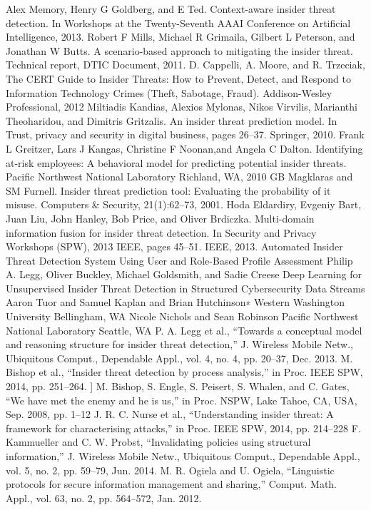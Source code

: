 \documentclass[conference]{IEEEtran}
\begin{document}
\begin{thebibliography}{00}
 Alex Memory, Henry G Goldberg, and E Ted. Context-aware insider threat detection. In Workshops at the Twenty-Seventh AAAI Conference on Artificial
Intelligence, 2013.
 Robert F Mills, Michael R Grimaila, Gilbert L Peterson, and Jonathan W Butts. A scenario-based approach to mitigating the insider threat. Technical report, DTIC Document, 2011.
  D. Cappelli, A. Moore, and R. Trzeciak, The CERT Guide to Insider Threats: How to Prevent, Detect, and Respond
to Information Technology Crimes (Theft, Sabotage, Fraud). Addison-Wesley Professional, 2012
  Miltiadis Kandias, Alexios Mylonas, Nikos Virvilis, Marianthi Theoharidou, and Dimitris Gritzalis. An insider threat prediction model. In Trust, privacy and security in digital business, pages 26–37. Springer, 2010.
Frank L Greitzer, Lars J Kangas, Christine F Noonan,and Angela C Dalton. Identifying at-risk employees: A behavioral model for predicting potential insider threats. Pacific Northwest National Laboratory Richland, WA, 2010
GB Magklaras and SM Furnell. Insider threat prediction tool: Evaluating the probability of it misuse. Computers \& Security, 21(1):62–73, 2001.
Hoda Eldardiry, Evgeniy Bart, Juan Liu, John Hanley, Bob Price, and Oliver Brdiczka. Multi-domain information fusion for insider threat detection. In Security and Privacy Workshops (SPW), 2013 IEEE, pages 45–51. IEEE, 2013.
Automated Insider Threat Detection System Using User and Role-Based Profile Assessment Philip A. Legg, Oliver Buckley, Michael Goldsmith, and Sadie Creese
  Deep Learning for Unsupervised Insider Threat Detection in Structured Cybersecurity Data Streams Aaron Tuor and Samuel Kaplan and Brian Hutchinson∗
Western Washington University Bellingham, WA Nicole Nichols and Sean Robinson Pacific Northwest National Laboratory Seattle, WA
  P. A. Legg et al., “Towards a conceptual model and reasoning structure for insider threat detection,” J. Wireless Mobile Netw., Ubiquitous Comput., Dependable Appl., vol. 4, no. 4, pp. 20–37, Dec. 2013.
 M. Bishop et al., “Insider threat detection by process analysis,” in Proc. IEEE SPW, 2014, pp. 251–264.
] M. Bishop, S. Engle, S. Peisert, S. Whalen, and C. Gates, “We have met the enemy and he is us,” in Proc. NSPW, Lake Tahoe, CA, USA, Sep. 2008, pp. 1–12
 J. R. C. Nurse et al., “Understanding insider threat: A framework for characterising attacks,” in Proc. IEEE SPW, 2014, pp. 214–228
F. Kammueller and C. W. Probst, “Invalidating policies using structural information,” J. Wireless Mobile Netw., Ubiquitous Comput., Dependable Appl., vol. 5, no. 2, pp. 59–79, Jun. 2014.
 M. R. Ogiela and U. Ogiela, “Linguistic protocols for secure information management and sharing,” Comput. Math. Appl., vol. 63, no. 2, pp. 564–572, Jan. 2012.




\end{thebibliography}
\end{document}

